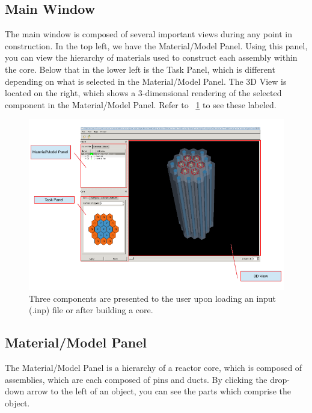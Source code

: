 \subsection{Main Window}
The main window is composed of several important views during any point in construction.  In the top left, we have the Material/Model Panel.  Using this panel, you can view the hierarchy of materials used to construct each assembly within the core.  Below that in the lower left is the Task Panel, which is different depending on what is selected in the Material/Model Panel. The 3D View is located on the right, which shows a 3-dimensional rendering of the selected component in the Material/Model Panel.  Refer to ~\ref{fig:mainwindow1} to see these labeled.

\begin{figure}[!htb]
\begin{center}
\includegraphics[width=0.6\linewidth]{Images/main-window-with-core-labeled-e1.png}
\caption{Three components are presented to the user upon loading an input (.inp) file or after building a core.}
\label{fig:mainwindow1}
\end{center}
\end{figure}


\subsection{Material/Model Panel}
The Material/Model Panel is a hierarchy of a reactor core, which is composed of assemblies, which are each composed of pins and ducts.  By clicking the drop-down arrow to the left of an object, you can see the parts which comprise the object.


